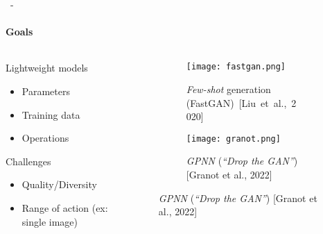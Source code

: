 \documentclass[aspectratio=169, 22pt]{beamer}
\begin{document}
\begin{frame}{\secname~- \subsecname}
  \framesubtitle{Goals}
  \begin{columns}
    \begin{column}{0.5\linewidth}
      \begin{customblock}{Lightweight models}
        \begin{itemize}
        \item \small Parameters
        \item \small Training data
        \item \small Operations
        \end{itemize}
      \end{customblock}
      \begin{alertblock}{Challenges}
        \begin{itemize}
        \item \small Quality/Diversity
        \item \small Range of action (ex: single image)
        \end{itemize}
      \end{alertblock}
    \end{column}
    \begin{column}{0.5\linewidth}
      \begin{figure}
        \centering
        \begin{subfigure}{\linewidth}
          \centering
          \texttt{[image: fastgan.png]}
          \caption{\emph{Few-shot} generation (FastGAN) [Liu et al., 2020]}
        \end{subfigure}
        
        \begin{subfigure}{\linewidth}
          \centering
          \texttt{[image: granot.png]}
          \caption{\emph{GPNN} (\emph{``Drop the GAN''}) [Granot et al., 2022]}
        \end{subfigure}
      \end{figure}
    \end{column}
  \end{columns}
\end{frame}
\end{document}
